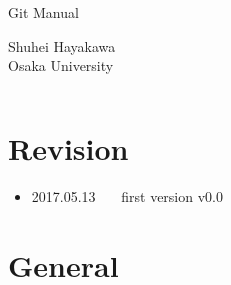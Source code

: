 \documentclass[a4j,12pt]{jsarticle}
\begin{document}
\thispagestyle{mypapernopage}

\sffamily

\begin{center}
  \Large{Git Manual}
\end{center}
\begin{flushright}
  Shuhei Hayakawa \\
  Osaka University
\end{flushright}

\[\]

\setcounter{section}{-1}

\section{Revision}

\begin{itemize}
  \item 2017.05.13 \ \ \ first version \dotfill v0.0
\end{itemize}

\section{General}
\end{document}
